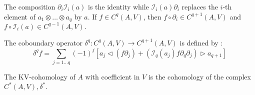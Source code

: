The composition $\partial_i \mathcal{I}_i(a)$ is the identity while $\mathcal{I}_i(a) \partial_i$ replaces the $i$-th element of $a_1 \otimes \dots \otimes a_q$ by $a.$
If $f \in C^q(A,V)$, then $f \circ \partial_i \in C^{q+1}(A,V)$ and $f \circ \mathcal{I}_i(a) \in C^{q-1}(A,V).$ 
\begin{defn}
    \label{def:kv_coboundary}
    The coboundary operator $\delta^q \colon C^q \left( A,V \right) \to C^{q+1}\left( A,V \right)$ is defined by \cite{Boyom2002}:
    \begin{equation}
        \label{eq:coboundary}
        \delta^q f = \sum_{j=1 \dots q} \left( -1 \right)^j \left[ a_j  \triangleleft \left(f \partial_j\right) + \left(\mathcal{I}_q(a_j) f \partial_{q}\partial_j\right)\triangleright a_{q+1}  \right]
    \end{equation}
\end{defn}
\begin{defn}
\label{def:kv_cohomology}
The KV-cohomology of $A$ with coefficient in $V$ is the cohomology of the complex $C^*\left( A,V \right), \delta^*.$
\end{defn}
